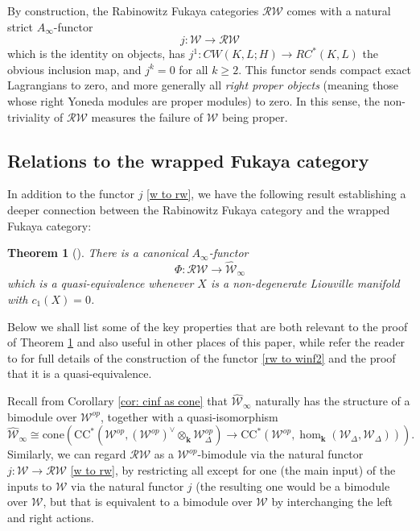 \documentclass[11pt]{amsproc}
\def\K{{\mathbf{k}}}
\def\w{\mathcal{W}(E)}
\def\r#1{\mathrm{#1}}
\def\w{\mathcal{W}}
\def\rw{\mathcal{RW}}
\def\D{\Delta}
\def\ainf{A_\infty}
\def\cone{\mathrm{cone}}
\def\winf{\widehat{\w}_{\infty}}
\newtheorem{thm}[lem]{Theorem}
\theoremstyle{remark}
\numberwithin{equation}{section}
\begin{document}
By construction, the Rabinowitz Fukaya categories $\rw$ comes with a natural strict $\ainf$-functor 
\begin{equation}\label{w to rw}
j: \w \to \rw
\end{equation}
which is the identity on objects,
has $j^{1}: CW(K, L; H) \to RC^{*}(K, L)$ the obvious inclusion map,
and $j^{k} = 0$ for all $k \ge 2$.
This functor sends compact exact Lagrangians to zero,
and more generally all {\it right proper objects} (meaning those whose right Yoneda modules are proper modules) to zero.
In this sense, the non-triviality of $\rw$ measures the failure of $\w$ being proper.

\subsection{Relations to the wrapped Fukaya category} \label{section: rw relation to w}

In addition to the functor $j$ \eqref{w to rw}, we have the following result establishing a deeper connection between the Rabinowitz Fukaya category and the wrapped Fukaya category:

\begin{thm}[{\cite[Theorem 1.1]{GGV}}]\label{thm: rw=winf}
There is a canonical $\ainf$-functor
\begin{equation}\label{rw to winf2}
\Phi: \rw \to \winf
\end{equation}
which is a quasi-equivalence whenever $X$ is a non-degenerate Liouville manifold with $c_{1}(X)=0$.
\end{thm}

Below we shall list some of the key properties that are both relevant to the proof of Theorem \ref{thm: rw=winf} and also useful in other places of this paper, 
while refer the reader to \cite{GGV} for full details of the construction of the functor \eqref{rw to winf2} and the proof that it is a quasi-equivalence.

Recall from Corollary \ref{cor: cinf as cone} that $\winf$ naturally has the structure of a bimodule over $\w^{op}$,
together with a quasi-isomorphism
\begin{equation}\label{winf as cone}
\winf \cong \cone(\r{CC}^{*}(\w^{op}, (\w^{op})^{\vee} \otimes_{\K} \w_{\D}^{op}) \to \r{CC}^{*}(\w^{op}, \hom_{\K}(\w_{\D}, \w_{\D}))).
\end{equation}
Similarly, we can regard $\rw$ as a $\w^{op}$-bimodule via the natural functor $j: \w \to \rw$ \eqref{w to rw},
by restricting all except for one (the main input) of the inputs to $\w$ via the natural functor $j$ (the resulting one would be a bimodule over $\w$, 
but that is equivalent to a bimodule over $\w$ by interchanging the left and right actions.
\end{document}
